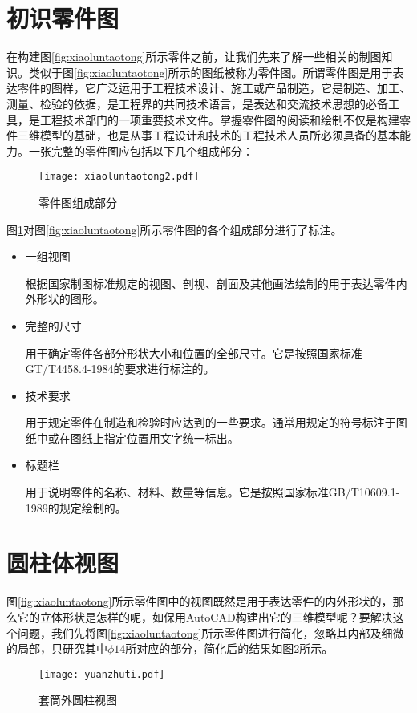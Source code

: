 \section{初识零件图}
在构建图\ref{fig:xiaoluntaotong}所示零件之前，让我们先来了解一些相关的制图知识。类似于图\ref{fig:xiaoluntaotong}所示的图纸被称为零件图。所谓零件图是用于表达零件的图样，它广泛运用于工程技术设计、施工或产品制造，它是制造、加工、测量、检验的依据，是工程界的共同技术语言，是表达和交流技术思想的必备工具，是工程技术部门的一项重要技术文件。掌握零件图的阅读和绘制不仅是构建零件三维模型的基础，也是从事工程设计和技术的工程技术人员所必须具备的基本能力。一张完整的零件图应包括以下几个组成部分：
\begin{figure}[htbp]
\centering
\texttt{[image: xiaoluntaotong2.pdf]}
\caption{零件图组成部分}\label{fig:xiaoluntaotong2}
\end{figure}
图\ref{fig:xiaoluntaotong2}对图\ref{fig:xiaoluntaotong}所示零件图的各个组成部分进行了标注。
\begin{itemize}
\item 一组视图

根据国家制图标准规定的视图、剖视、剖面及其他画法绘制的用于表达零件内外形状的图形。
\item 完整的尺寸

用于确定零件各部分形状大小和位置的全部尺寸。它是按照国家标准GT/T4458.4-1984的要求进行标注的。
\item 技术要求

用于规定零件在制造和检验时应达到的一些要求。通常用规定的符号标注于图纸中或在图纸上指定位置用文字统一标出。
\item 标题栏

用于说明零件的名称、材料、数量等信息。它是按照国家标准GB/T10609.1-1989的规定绘制的。
\end{itemize}

\section{圆柱体视图}
图\ref{fig:xiaoluntaotong}所示零件图中的视图既然是用于表达零件的内外形状的，那么它的立体形状是怎样的呢，如保用AutoCAD构建出它的三维模型呢？要解决这个问题，我们先将图\ref{fig:xiaoluntaotong}所示零件图进行简化，忽略其内部及细微的局部，只研究其中$\phi 14$所对应的部分，简化后的结果如图\ref{fig:yuanzhuti}所示。
\begin{figure}[htbp]
\centering
\texttt{[image: yuanzhuti.pdf]}
\caption{套筒外圆柱视图}\label{fig:yuanzhuti}
\end{figure}

